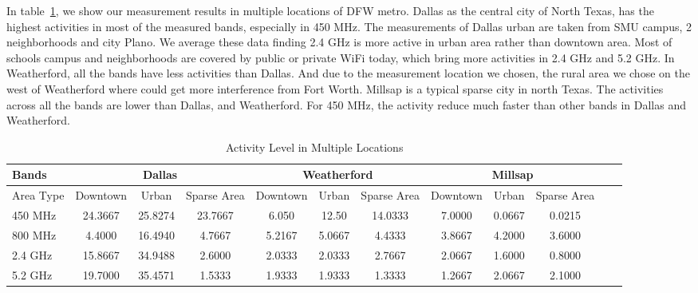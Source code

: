 In table~\ref{tab:activitymeasurement}, we show our measurement results in multiple locations of DFW metro.
Dallas as the central city of North Texas, has the highest activities in most of the measured bands,
 especially in 450 MHz. The measurements of Dallas urban are taken from SMU campus, 2 neighborhoods
 and city Plano. We average these data finding 2.4 GHz is more active in urban area rather than 
 downtown area. Most of schools campus and neighborhoods are covered by public or private WiFi today,
which bring more activities in 2.4 GHz and 5.2 GHz.
In Weatherford, all the bands have less activities than Dallas. And due to the measurement location
we chosen, the rural area we chose on the west of Weatherford where could get more interference from
Fort Worth.
Millsap is a typical sparse city in north Texas. The activities across all the bands are lower than
Dallas, and Weatherford. For 450 MHz, the activity reduce much faster than other bands in Dallas
and Weatherford. 

\begin{table}
\centering %
\begin{tabular}{|l|c|c|c|c|c|c|c|c|c|c|c|} %
\hline %
Bands     & \multicolumn{3}{c|}{Dallas} & \multicolumn{3}{c|}{Weatherford} & \multicolumn{3}{c|}{Millsap} \\%
\hline %
Area Type & Downtown & Urban & Sparse Area & Downtown &  Urban   & Sparse Area & Downtown & Urban & Sparse Area \\ %
\hline %
450 MHz &24.3667	&25.8274  &23.7667	&6.050 &12.50  &14.0333 & 7.0000 & 0.0667 & 0.0215 \\      
\hline %
800 MHz &4.4000 	&16.4940  &4.7667	&5.2167&5.0667 &4.4333  & 3.8667 & 4.2000 & 3.6000 \\      
\hline %
2.4 GHz &15.8667 	&34.9488  &2.6000	&2.0333&2.0333 &2.7667  & 2.0667 & 1.6000 & 0.8000 \\      
\hline %
5.2 GHz &19.7000	&35.4571  &1.5333	&1.9333&1.9333 &1.3333  & 1.2667 & 2.0667 & 2.1000 \\      
\hline %
\end{tabular}    
\label{tab:activitymeasurement}    
\caption{Activity Level in Multiple Locations} %
\vspace{-0.4in}
\end{table}    

